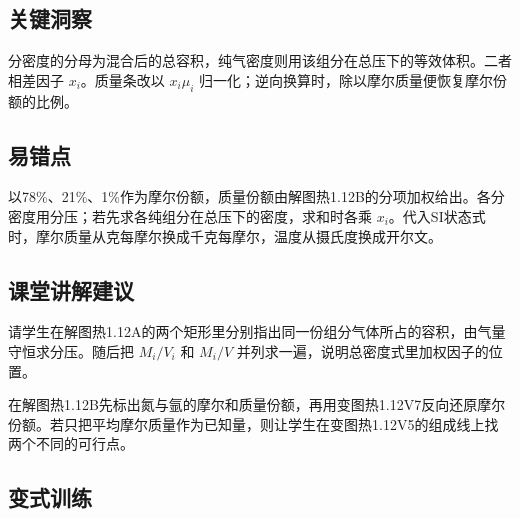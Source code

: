 \documentclass[UTF8,fontset=fandol,a4paper,11pt]{ctexart}
\begin{document}


\subsection*{关键洞察}

分密度的分母为混合后的总容积，纯气密度则用该组分在总压下的等效体积。二者相差因子 $x_i$。质量条改以 $x_i\mu_i$ 归一化；逆向换算时，除以摩尔质量便恢复摩尔份额的比例。



\subsection*{易错点}

以78\%、21\%、1\%作为摩尔份额，质量份额由解图热1.12B的分项加权给出。各分密度用分压；若先求各纯组分在总压下的密度，求和时各乘 $x_i$。代入SI状态式时，摩尔质量从克每摩尔换成千克每摩尔，温度从摄氏度换成开尔文。



\subsection*{课堂讲解建议}

请学生在解图热1.12A的两个矩形里分别指出同一份组分气体所占的容积，由气量守恒求分压。随后把 $M_i/V_i$ 和 $M_i/V$ 并列求一遍，说明总密度式里加权因子的位置。

在解图热1.12B先标出氮与氩的摩尔和质量份额，再用变图热1.12V7反向还原摩尔份额。若只把平均摩尔质量作为已知量，则让学生在变图热1.12V5的组成线上找两个不同的可行点。




\subsection*{变式训练}
\end{document}
